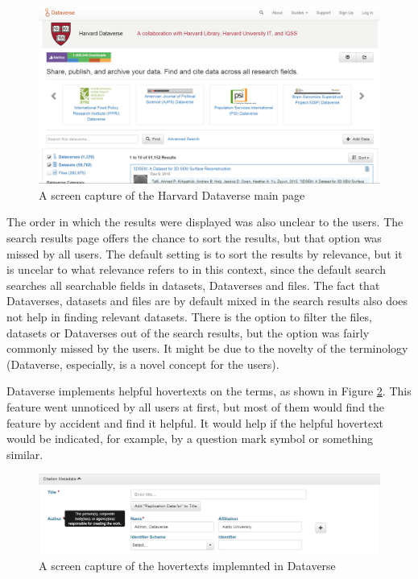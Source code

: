 \begin{figure}
    \begin{centering}
        \includegraphics[width=\textwidth]{images/search_main_page}
    \end{centering}
    \caption{A screen capture of the Harvard Dataverse main page}
    \label{fig:search_main_page}
\end{figure}

The order in which the results were displayed was also unclear to the users.
The search results page offers the chance to sort the results, but that option
was missed by all users. The default setting is to sort the results by
relevance, but it is uncelar to what relevance refers to in this context, since
the default search searches all searchable fields in datasets, Dataverses and files.
The fact that Dataverses, datasets and files are by default mixed in the search
results also does not help in finding relevant datasets. There is the option to
filter the files, datasets or Dataverses out of the search results, but the
option was fairly commonly missed by the users. It might be due to the novelty
of the terminology (Dataverse, especially, is a novel concept for the users).

Dataverse implements helpful hovertexts on the terms, as shown in Figure
\ref{fig:hovertext}. This feature went unnoticed by all users at first, but
most of them would find the feature by accident and find it helpful. It would
help if the helpful hovertext would be indicated, for example, by a question
mark symbol or something similar.

\begin{figure}
    \begin{centering}
        \includegraphics[width=\textwidth]{images/hovertext}
    \end{centering}
    \caption{A screen capture of the hovertexts implemnted in Dataverse}
    \label{fig:hovertext}
\end{figure}

